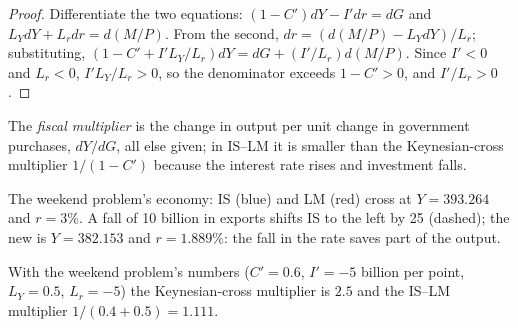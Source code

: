 \begin{proof}
Differentiate the two equations: $(1 - C')dY - I'dr = dG$ and $L_Y dY + L_r dr = d(M/P)$.
From the second, $dr = (d(M/P) - L_Y dY)/L_r$; substituting,
$(1 - C' + I'L_Y/L_r)dY = dG + (I'/L_r)d(M/P)$. Since $I' < 0$ and $L_r < 0$, $I'L_Y/L_r > 0$, so the
denominator exceeds $1 - C' > 0$, and $I'/L_r > 0$.
\end{proof}

\begin{definition}\label{def:b1:is-lm:fiscal-multiplier}
The \emph{fiscal multiplier} is the change in output per unit change in
government purchases, $dY/dG$, all else given; in IS--LM it is smaller than
the Keynesian-cross multiplier $1/(1 - C')$ because the interest rate rises and
investment falls.
\end{definition}

\begin{omfigure}

{\small The weekend problem's economy: IS (blue) and LM (red) cross at
$Y = 393.264$ and $r = 3\%$. A fall of 10 billion in exports shifts IS to the left by
25 (dashed); the new  is $Y = 382.153$ and $r = 1.889\%$: the fall in the
rate saves part of the output.}
\end{omfigure}

With the weekend problem's numbers ($C' = 0.6$, $I' = -5$ billion per point,
$L_Y = 0.5$, $L_r = -5$) the Keynesian-cross multiplier is $2.5$ and the IS--LM
multiplier $1/(0.4 + 0.5) = 1.111$. %

